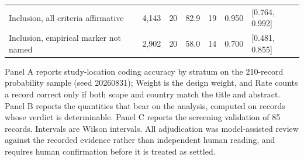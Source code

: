 \begin{table}[!t]
\begin{tabular*}{\textwidth}{@{\extracolsep\fill}l r r r r r l@{}}
Inclusion, all criteria affirmative & 4,143 & 20 & 82.9 & 19 & 0.950 & [0.764, 0.992] \\
Inclusion, empirical marker not named & 2,902 & 20 & 58.0 & 14 & 0.700 & [0.481, 0.855] \\
\bottomrule
\end{tabular*}
\begin{tablenotes}
\item[] Panel A reports study-location coding accuracy by stratum on the 210-record probability sample (seed 20260831); Weight is the design weight, and Rate counts a record correct only if both scope and country match the title and abstract. Panel B reports the quantities that bear on the analysis, computed on records whose verdict is determinable. Panel C reports the screening validation of 85 records. Intervals are Wilson intervals. All adjudication was model-assisted review against the recorded evidence rather than independent human reading, and requires human confirmation before it is treated as settled.
\end{tablenotes}
\end{table}
